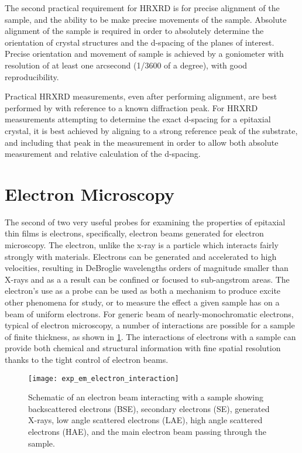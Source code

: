 The second practical requirement for HRXRD is for precise alignment of the sample, and the ability to be make precise movements of the sample. Absolute alignment of the sample is required in order to absolutely determine the orientation of crystal structures and the d-spacing of the planes of interest. Precise orientation and movement of sample is achieved by a goniometer with resolution of at least one arcsecond (1/3600 of a degree), with good reproducibility.

Practical HRXRD measurements, even after performing alignment, are best performed by with reference to a known diffraction peak. For HRXRD measurements attempting to determine the exact d-spacing for a epitaxial crystal, it is best achieved by aligning to a strong reference peak of the substrate, and including that peak in the measurement in order to allow both absolute measurement and relative calculation of the d-spacing.

\section{Electron Microscopy}
The second of two very useful probes for examining the properties of epitaxial thin films is electrons, specifically, electron beams generated for electron microscopy. The electron, unlike the x-ray is a particle which interacts fairly strongly with materials. Electrons can be generated and accelerated to high velocities, resulting in DeBroglie wavelengths orders of magnitude smaller than X-rays and as a a result can be confined or focused to sub-angstrom areas. The electron's use as a probe can be used as both a mechanism to produce excite other phenomena for study, or to measure the effect a given sample has on a beam of uniform electrons. For generic beam of nearly-monochromatic electrons, typical of electron microscopy, a number of interactions are possible for a sample of finite thickness, as shown in \cref{fig:exp_em_electron_interaction}. The interactions of electrons with a sample can provide both chemical and structural information with fine spatial resolution thanks to the tight control of electron beams.
\begin{figure}
    \centering
    \texttt{[image: exp\_em\_electron\_interaction]}
    \caption[Electron interactions with materials]{\label{fig:exp_em_electron_interaction}Schematic of an electron beam interacting with a sample showing backscattered electrons (BSE), secondary electrons (SE), generated X-rays, low angle scattered electrons (LAE), high angle scattered electrons (HAE), and the main electron beam passing through the sample.}
\end{figure}

